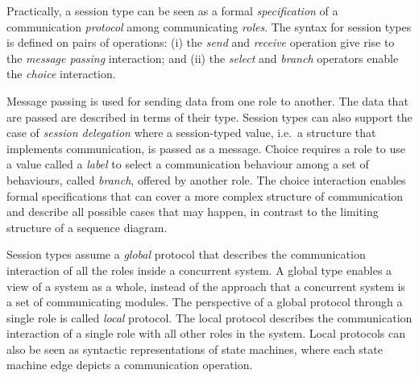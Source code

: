 
Practically, a session type can be seen as a formal
{\em specification} of a communication {\em protocol} among communicating {\em roles}.
The syntax for session types is defined on pairs of operations:
(i) the {\em send} and {\em receive} operation give rise to
the {\em message passing} interaction; and
(ii) the {\em select} and {\em branch} operators enable the
{\em choice} interaction.

Message passing is used for sending data from one role to another.
The data that are passed are described in terms of their type. Session
types can also support the case of {\em session delegation}
where a session-typed value, i.e.~a structure that implements communication,
is passed as a message.
Choice requires a role to use a value called a {\em label}
to select a communication behaviour among
a set of behaviours, called {\em branch}, offered by another role.
The choice interaction enables formal specifications that can
cover a more complex structure of communication and describe all possible
cases that may happen, in contrast to the limiting structure of
a sequence diagram.

Session types assume a {\em global} protocol that describes the
communication interaction of all the roles inside a concurrent system.
A global type enables a view of a system as a whole, instead of the
approach that a concurrent system is a set of communicating modules.
The perspective of a global protocol through a single role
is called {\em local} protocol. The local protocol describes
the communication interaction of a single role with all other roles
in the system. Local protocols can also be seen as syntactic
representations of state machines, where each state machine edge
depicts a communication operation.

